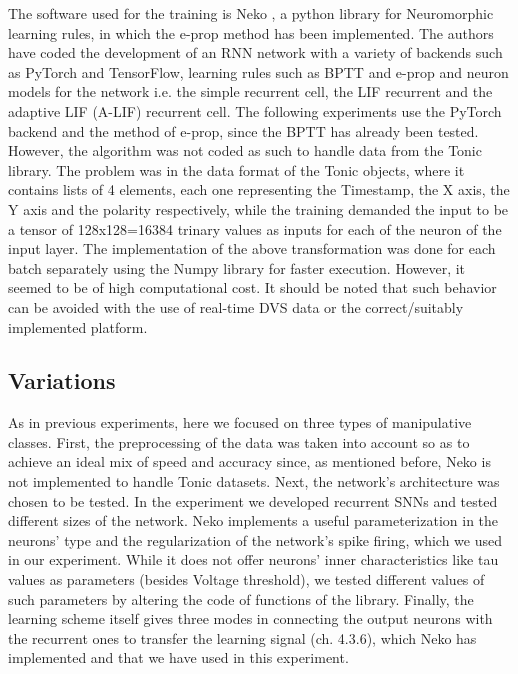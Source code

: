 \documentclass[12pt]{report}
\begin{document}
The software used for the training is Neko \cite{Brasoveanu2020}, a python library for Neuromorphic learning rules, in which the e-prop method has been implemented. The authors have coded the development of an RNN network with a variety of backends such as PyTorch and TensorFlow, learning rules such as BPTT and e-prop and neuron models for the network i.e. the simple recurrent cell, the LIF recurrent and the adaptive LIF (A-LIF) recurrent cell. The following experiments use the PyTorch backend and the method of e-prop, since the BPTT has already been tested. However, the algorithm was not coded as such to handle data from the Tonic library. The problem was in the data format of the Tonic objects, where it contains lists of 4 elements, each one representing the Timestamp, the X axis, the Y axis and the polarity respectively, while the training demanded the input to be a tensor of 128x128=16384 trinary values as inputs for each of the neuron of the input layer. The implementation of the above transformation was done for each batch separately using the Numpy library for faster execution. However, it seemed to be of high computational cost. It should be noted that such behavior can be avoided with the use of real-time DVS data or the correct/suitably implemented platform.

\subsection{Variations}

As in previous experiments, here we focused on three types of manipulative classes. First, the preprocessing of the data was taken into account so as to achieve an ideal mix of speed and accuracy since, as mentioned before, Neko is not implemented to handle Tonic datasets. Next, the network's architecture was chosen to be tested. In the experiment we developed recurrent SNNs and tested different sizes of the network. Neko implements a useful parameterization in the neurons' type and the regularization of the network's spike firing, which we used in our experiment. While it does not offer neurons' inner characteristics like tau values as parameters (besides Voltage threshold), we tested different values of such parameters by altering the code of functions of the library. Finally, the learning scheme itself gives three modes in connecting the output neurons with the recurrent ones to transfer the learning signal (ch. 4.3.6), which Neko has implemented and that we have used in this experiment.
\end{document}
